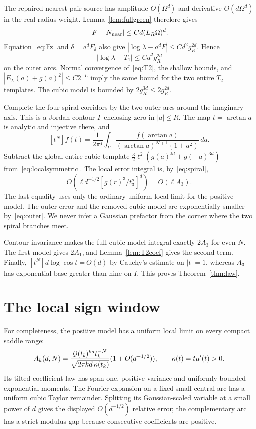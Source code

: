 \documentclass[11pt,a4paper]{article}
\begin{document}
The repaired nearest-pair source has amplitude $O(\Omega^d)$ and derivative $O(d\Omega^d)$ in the real-radius weight. Lemma~\ref{lem:fullgreen} therefore gives
\[
 |F-N_{\rm near}|\le Cd(L_R\Omega)^d.
\]
Equation~\eqref{eq:Fz} and $\delta=a^dF_\delta$ also give
$|\log\lambda-a^dF|\le Cd^2g_R^{2d}$. Hence
\[
 |\log\lambda-T_1|\le Cd^2g_R^{2d}
\]
on the outer arcs. Normal convergence of~\eqref{eq:T2}, the shallow bounds, and
$|E_L(a)+g(a)^2|\le C2^{-L}$ imply the same bound for the two entire $T_2$ templates. The cubic model is bounded by $2g_R^{3d}\le2g_R^{2d}$.

Complete the four spiral corridors by the two outer arcs around the imaginary axis. This is a Jordan contour $\Gamma$ enclosing zero in $|a|\le R$. The map $t=\arctan a$ is analytic and injective there, and
\begin{equation}\label{eq:Cauchy}
 [t^N]f(t)=\frac1{2\pi i}\int_\Gamma
 \frac{f(\arctan a)}{(\arctan a)^{N+1}(1+a^2)}\,da.
\end{equation}
Subtract the global entire cubic template
$\tfrac32\ell^2(g(a)^{3d}+g(-a)^{3d})$ from~\eqref{eq:localsymmetric}. The local error integral is, by~\eqref{eq:spiral},
\[
 O\!\left(\ell d^{-1/2}
          [g(r)^3/t_3^\sigma]^d\right)=O(\ell A_3).
\]
The last equality uses only the ordinary uniform local limit for the positive model. The outer error and the removed cubic model are exponentially smaller by~\eqref{eq:outer}. We never infer a Gaussian prefactor from the corner where the two spiral branches meet.

Contour invariance makes the full cubic-model integral exactly $2A_3$ for even $N$. The first model gives $2A_1$, and Lemma~\ref{lem:T2coef} gives the second term. Finally, $[t^N]d\log\cos t=O(d)$ by Cauchy's estimate on $|t|=1$, whereas $A_3$ has exponential base greater than nine on $I$. This proves Theorem~\ref{thm:law}.

\section{The local sign window}
For completeness, the positive model has a uniform local limit on every compact saddle range:
\[
 A_k(d,N)=\frac{\mathcal G(t_k)^{kd}t_k^{-N}}
 {\sqrt{2\pi k d\,\kappa(t_k)}}(1+O(d^{-1/2})),
 \qquad \kappa(t)=t\mu'(t)>0.
\]
Its tilted coefficient law has span one, positive variance and uniformly bounded exponential moments. The Fourier expansion on a fixed small central arc has a uniform cubic Taylor remainder. Splitting its Gaussian-scaled variable at a small power of $d$ gives the displayed $O(d^{-1/2})$ relative error; the complementary arc has a strict modulus gap because consecutive coefficients are positive.
\end{document}
